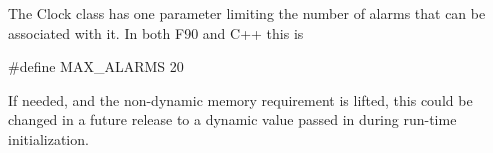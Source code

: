 
The Clock class has one parameter limiting the number of alarms that can be
associated with it.  In both F90 and C++ this is

        \#define MAX\_ALARMS 20

If needed, and the non-dynamic memory requirement is lifted, this could be
changed in a future release to a dynamic value passed in during run-time
initialization.
